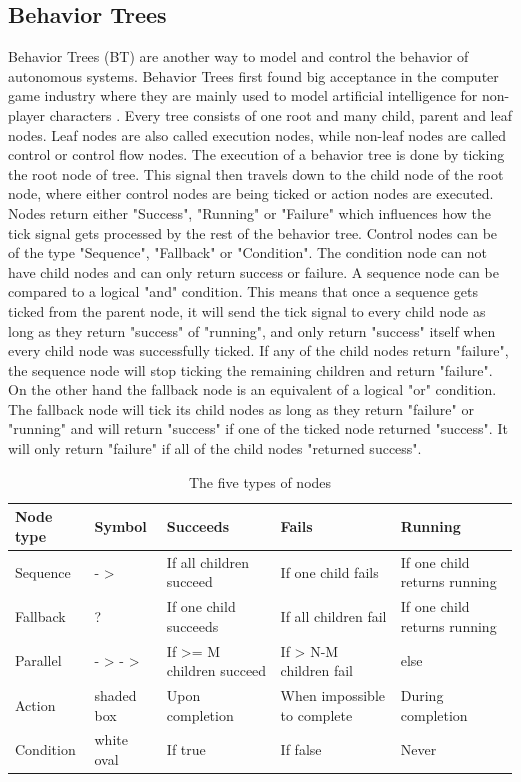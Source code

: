 \subsection{Behavior Trees}
Behavior Trees (BT) are another way to model and control the behavior of autonomous systems. Behavior Trees first found big acceptance in the computer game industry where they are mainly used to model artificial intelligence for non-player characters \cite{florez2009}. Every tree consists of one root and many child, parent and leaf nodes. Leaf nodes are also called execution nodes, while non-leaf nodes are called control or control flow nodes. 
The execution of a behavior tree is done by ticking the root node of tree. This signal then travels down to the child node of the root node, where either control nodes are being ticked or action nodes are executed. Nodes return either "Success", "Running" or "Failure" which influences how the tick signal gets processed by the rest of the behavior tree. Control nodes can be of the type "Sequence", "Fallback" or "Condition". The condition node can not have child nodes and can only return success or failure. A sequence node can be compared to a logical "and" condition. This means that once a sequence gets ticked from the parent node, it will send the tick signal to every child node as long as they return "success" of "running", and only return "success" itself when every child node was successfully ticked. If any of the child nodes return "failure", the sequence node will stop ticking the remaining children and return "failure". On the other hand the fallback node is an equivalent of a logical "or" condition. The fallback node will tick its child nodes as long as they return "failure" or "running" and will return "success" if one of the ticked node returned "success". It will only return "failure" if all of the child nodes "returned success".

\begin{table}[h!]
	\caption{The five types of nodes \cite{iovino2022}}
	\begin{tabular}{ | m{} | m{}| m{} | m{} | m{} |} 
  	\hline
  	Node type & Symbol & Succeeds & Fails & Running \\ 
  	\hline
  	Sequence & - > & If all children succeed &  If one child fails & If one child returns running \\ 
  	\hline
  	Fallback & ? & If one child succeeds & If all children fail & If one child returns running \\ 
  	\hline
  	Parallel & - > - > & If >= M children succeed & If > N-M children fail & else \\
  	\hline
  	Action & shaded box & Upon completion & When impossible to complete & During completion \\
  	\hline
  	Condition & white oval & If true & If false & Never \\
  	\hline
	\end{tabular}
\end{table}


